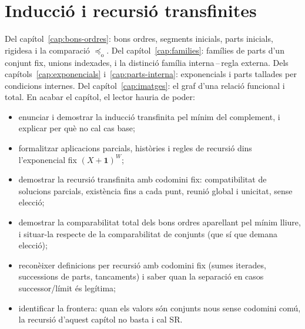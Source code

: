 \chapter{Inducció i recursió transfinites}\label{cap:recursio}

\begin{objectius}
 Del capítol~\ref{cap:bons-ordres}: bons ordres, segments inicials, parts inicials, rigidesa i la comparació \(\preceq_{\mathrm o}\). Del capítol~\ref{cap:families}: famílies de parts d'un conjunt fix, unions indexades, i la distinció família interna\,--\,regla externa. Dels capítols~\ref{cap:exponencials} i~\ref{cap:parts-interna}: exponencials i parts tallades per condicions internes. Del capítol~\ref{cap:imatges}: el graf d'una relació funcional i total.
 En acabar el capítol, el lector hauria de poder:
\begin{itemize}
  \item enunciar i demostrar la inducció transfinita pel mínim del complement, i explicar per què no cal cas base;
  \item formalitzar aplicacions parcials, històries i regles de recursió dins l'exponencial fix \((X+\mathbf1)^W\);
  \item demostrar la recursió transfinita amb codomini fix: compatibilitat de solucions parcials, existència fins a cada punt, reunió global i unicitat, sense elecció;
  \item demostrar la comparabilitat total dels bons ordres aparellant pel mínim lliure, i situar-la respecte de la comparabilitat de conjunts (que sí que demana elecció);
  \item reconèixer definicions per recursió amb codomini fix (sumes iterades, successions de parts, tancaments) i saber quan la separació en casos successor/límit és legítima;
  \item identificar la frontera: quan els valors són conjunts nous sense codomini comú, la recursió d'aquest capítol no basta i cal SR.
\end{itemize}
\end{objectius}

